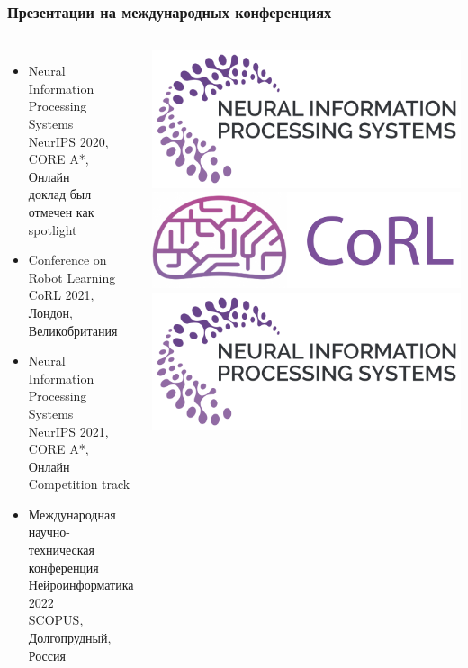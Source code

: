 \begin{frame}[t,allowframebreaks]
\frametitle{Презентации на международных конференциях}
\vspace{20pt}
\setlength{\leftmargini}{0cm}


\begin{columns}

\begin{itemize}
\setlength\itemsep{1em}
    \item[] {\color{orange}Neural Information Processing Systems}\\
    NeurIPS 2020, CORE A*, Онлайн\\
    доклад был отмечен как spotlight
    \item[] {\color{orange}Conference on Robot Learning}\\
    CoRL 2021, Лондон, Великобритания
    \item[] {\color{orange}Neural Information Processing Systems}\\
    NeurIPS 2021, CORE A*, Онлайн\\
    Competition track
    \item[] Международная научно-техническая конференция Нейроинформатика 2022\\
    SCOPUS, Долгопрудный, Россия
\end{itemize} 
\includegraphics[width=1\linewidth]{Presentation/images/logo/neurips.png}
\includegraphics[width=1\linewidth]{Presentation/images/logo/corl.png}
\includegraphics[width=1\linewidth]{Presentation/images/logo/neurips.png}

\end{columns}
\end{frame}
